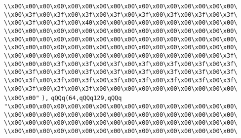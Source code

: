 \verb|\\x00\x00\x00\x00\x00\x00\x00\x00\x00\x00\x00\x00\x00\x00\x00\x00\|\newline
\verb|\\x00\x3f\x00\x3f\x00\x3f\x00\x3f\x00\x3f\x00\x3f\x00\x3f\x00\x3f\|\newline
\verb|\\x00\x3f\x00\x3f\x00\x40\x00\x00\x00\x00\x00\x00\x00\x00\x00\x00\|\newline
\verb|\\x00\x00\x00\x00\x00\x00\x00\x00\x00\x00\x00\x00\x00\x00\x00\x00\|\newline
\verb|\\x00\x00\x00\x00\x00\x00\x00\x00\x00\x00\x00\x00\x00\x00\x00\x00\|\newline
\verb|\\x00\x00\x00\x00\x00\x00\x00\x00\x00\x00\x00\x00\x00\x00\x00\x00\|\newline
\verb|\\x00\x00\x00\x00\x00\x00\x00\x00\x00\x00\x00\x00\x00\x00\x00\x3f\|\newline
\verb|\\x00\x00\x00\x3f\x00\x3f\x00\x3f\x00\x3f\x00\x3f\x00\x3f\x00\x3f\|\newline
\verb|\\x00\x3f\x00\x3f\x00\x3f\x00\x3f\x00\x3f\x00\x3f\x00\x3f\x00\x3f\|\newline
\verb|\\x00\x3f\x00\x3f\x00\x3f\x00\x3f\x00\x3f\x00\x3f\x00\x3f\x00\x3f\|\newline
\verb|\\x00\x3f\x00\x3f\x00\x3f\x00\x00\x00\x00\x00\x00\x00\x00\x00\x00\|\newline
\verb|\\x00\x00"|\newline
\verb|),|\newline
\verb|qQQq(64,qQQq129,qQQq|\newline
\verb|"\x00\x00\x00\x00\x00\x00\x00\x00\x00\x00\x00\x00\x00\x00\x00\x00\|\newline
\verb|\\x00\x00\x00\x00\x00\x00\x00\x00\x00\x00\x00\x00\x00\x00\x00\x00\|\newline
\verb|\\x00\x00\x00\x00\x00\x00\x00\x00\x00\x00\x00\x00\x00\x00\x00\x00\|\newline
\verb|\\x00\x00\x00\x00\x00\x00\x00\x00\x00\x00\x00\x00\x00\x00\x00\x00\|\newline
